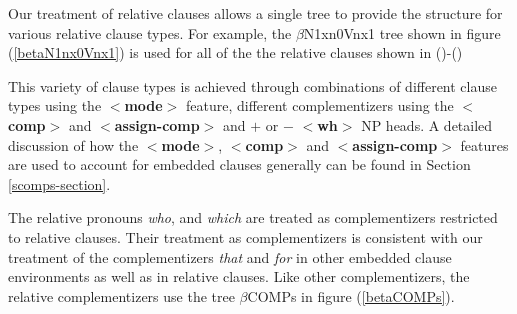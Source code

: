 \begin{figure}[htbp]
\end{figure}




Our treatment of relative clauses allows a single tree to provide the
structure for various relative clause types. For example, the
$\beta$N1xn0Vnx1 tree shown in figure (\ref{betaN1nx0Vnx1}) is used
for all of the the relative clauses shown in ()-()
\vspace{0.5cm}


This variety of clause types is achieved through combinations of
different clause types using the {\bf $<$mode$>$} feature, different
complementizers using the {\bf $<$comp$>$} and {\bf $<$assign-comp$>$}
and {\bf $+$} or {\bf $-$} {\bf $<$wh$>$} NP heads. A detailed
discussion of how the {\bf $<$mode$>$}, {\bf $<$comp$>$} and {\bf
$<$assign-comp$>$} features are used to account for embedded clauses
generally can be found in Section
\ref{scomps-section}.  

The relative pronouns {\it who}, and {\it which} are treated as
complementizers restricted to relative clauses.  Their treatment as
complementizers is consistent with our treatment of the
complementizers {\it that} and {\it for} in other embedded clause
environments as well as in relative clauses. Like other
complementizers, the relative complementizers use the tree
$\beta$COMPs in figure (\ref{betaCOMPs}).


\begin{figure}[htbp]
\end{figure}

